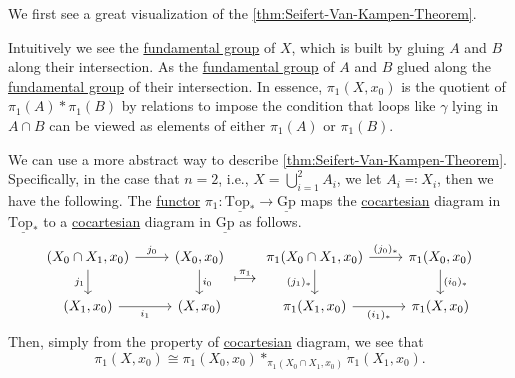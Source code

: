 \begin{eg}
	We first see a great visualization of the \autoref{thm:Seifert-Van-Kampen-Theorem}.
	\begin{figure}[H]
		\centering
		\label{fig:eg:Seifert-Van-Kampen-Theorem}
	\end{figure}
	Intuitively we see the \hyperref[def:fundamental-group]{fundamental group} of \(X\), which is built by gluing \(A\) and \(B\) along their intersection.
	As the \hyperref[def:fundamental-group]{fundamental group} of \(A\) and \(B\) glued along the \hyperref[def:fundamental-group]{fundamental group} of their
	intersection. In essence, \(\pi _1 (X, x_0)\) is the quotient of \(\pi _1(A)\ast \pi _1(B)\) by relations to impose the condition that loops like \(\gamma \)
	lying in \(A\cap B\) can be viewed as elements of either \(\pi _1(A)\) or \(\pi _1(B)\).
\end{eg}

\begin{remark}
	We can use a more abstract way to describe \autoref{thm:Seifert-Van-Kampen-Theorem}. Specifically, in the case that \(n = 2\), i.e., \(X = \bigcup\limits_{i=1}^{2} A_{i} \),
	we let \(A_{i} \eqqcolon X_{i} \), then we have the following. The \hyperref[def:functor]{functor} \(\pi _1\colon \underline{\mathrm{Top}_{\ast}}\to \underline{\mathrm{Gp}}\)
	maps the \hyperref[def:cocartesian]{cocartesian} diagram in \(\underline{\mathrm{Top} _\ast}\) to a \hyperref[def:cocartesian]{cocartesian} diagram in \(\underline{\mathrm{Gp} }\)
	as follows.
	\[\begin{tikzcd}
			{(X_0\cap X_1, x_0)} & {(X_0, x_0)} \\
			{(X_1, x_0)} & {(X, x_0)}
			\arrow["{j_0}", from=1-1, to=1-2]
			\arrow["{i_0}", from=1-2, to=2-2]
			\arrow["{i_1}"', from=2-1, to=2-2]
			\arrow["{j_1}"', from=1-1, to=2-1]
		\end{tikzcd}\overset{\pi _1}{\longmapsto}
		\begin{tikzcd}
			{\pi_1(X_0\cap X_1, x_0)} & {\pi_1(X_0, x_0)} \\
			{\pi_1(X_1, x_0)} & {\pi_1(X, x_0)}
			\arrow["{(j_0)_\ast}", from=1-1, to=1-2]
			\arrow["{(i_0)_\ast}", from=1-2, to=2-2]
			\arrow["{(i_1)_\ast}"', from=2-1, to=2-2]
			\arrow["{(j_1)_\ast}"', from=1-1, to=2-1]
		\end{tikzcd} \]
	Then, simply from the property of \hyperref[def:cocartesian]{cocartesian} diagram, we see that
	\[
		\pi _1(X, x_0)\cong \pi _1(X_0, x_0)\ast_{\pi _1(X_0 \cap X_1, x_0)}\pi _1(X_1, x_0).
	\]
\end{remark}

